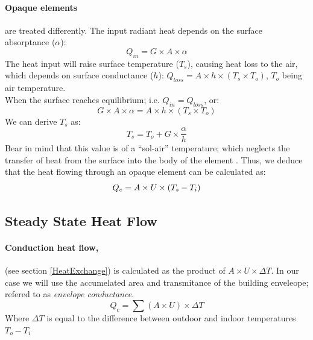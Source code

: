 \documentclass[a4paper,twoside,12pt,openright,final,oldfontcommands]{memoir}
\begin{document}
\paragraph{Opaque elements}are treated differently. The input radiant heat depends on the surface
absorptance ($\alpha$): 
\begin{equation}
Q_{in}=G\times A\times \alpha
\label{OpInRad}
\end{equation}
The heat input will raise surface temperature ($T_s$), causing heat loss to the air, which depends
on surface conductance ($h$): $Q_{loss}=A\times h\times (T_s\times T_o)$, $T_o$ being air
temperature.\\
When the surface reaches equilibrium; i.e. $Q_{in}=Q_{loss}$, or:
\begin{equation}
G\times A\times \alpha = A\times h\times (T_s\times T_o)
\end{equation}
We can derive $T_s$ as:
\begin{equation}
T_s=T_o+G\times \frac{\alpha}{h}
\end{equation}
Bear in mind that this value is of a ``sol-air'' temperature; which neglects the transfer of
heat from the surface into the body of the element \cite{szokolay08}. Thus, we deduce that the heat
flowing through an opaque element can be calculated as:
\begin{equation}
Q_c=A\times U \times (T_s-T_i)
\newline
\end{equation}
\flushleft

\subsection{Steady State Heat Flow}
\paragraph{Conduction heat flow,}(see section \ref{HeatExchange}) is calculated as the product of
$A\times U\times \Delta T$. In our case we will use the accumelated area and transmitance of the
building enveleope; refered to as \emph{envelope conductance}.
\begin{equation}
Q_c=\sum(A\times U)\times \Delta T
\label{EnvConduct}
\end{equation}
{\footnotesize Where $\Delta T$ is equal to the difference between outdoor and indoor
temperatures $T_o-T_i$}
\end{document}

